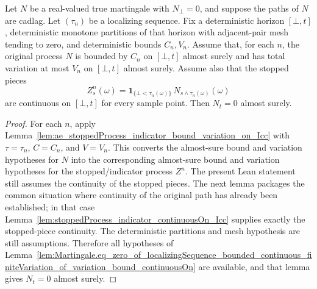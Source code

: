 \begin{lemma}\label{lem:Martingale.eq_zero_of_localizingSequence_of_bound_variation_bound_continuousOn}
Let \(N\) be a real-valued true martingale with \(N_\bot=0\), and suppose the
paths of \(N\) are cadlag.  Let \((\tau_n)\) be a localizing sequence.  Fix a
deterministic horizon \([\bot,t]\), deterministic monotone partitions of that
horizon with adjacent-pair mesh tending to zero, and deterministic bounds
\(C_n,V_n\).  Assume that, for each \(n\), the original process \(N\) is
bounded by \(C_n\) on \([\bot,t]\) almost surely and has total variation at
most \(V_n\) on \([\bot,t]\) almost surely.  Assume also that the stopped
pieces
\[
  Z^n_s(\omega)=
  \mathbf 1_{\{\bot<\tau_n(\omega)\}}\,
  N_{s\wedge\tau_n(\omega)}(\omega)
\]
are continuous on \([\bot,t]\) for every sample point.  Then \(N_t=0\) almost
surely.
\end{lemma}

\begin{proof}
For each \(n\), apply
Lemma~\ref{lem:ae_stoppedProcess_indicator_bound_variation_on_Icc} with
\(\tau=\tau_n\), \(C=C_n\), and \(V=V_n\).  This converts the almost-sure
bound and variation hypotheses for \(N\) into the corresponding almost-sure
bound and variation hypotheses for the stopped/indicator process \(Z^n\).
The present Lean statement still assumes the continuity of the stopped
pieces.  The next lemma packages the common situation where continuity of the
original path has already been established; in that case
Lemma~\ref{lem:stoppedProcess_indicator_continuousOn_Icc} supplies exactly
the stopped-piece continuity.  The deterministic partitions and mesh
hypothesis are still assumptions.  Therefore all hypotheses of
Lemma~\ref{lem:Martingale.eq_zero_of_localizingSequence_bounded_continuous_finiteVariation_of_variation_bound_continuousOn}
are available, and that lemma gives \(N_t=0\) almost surely.
\end{proof}


